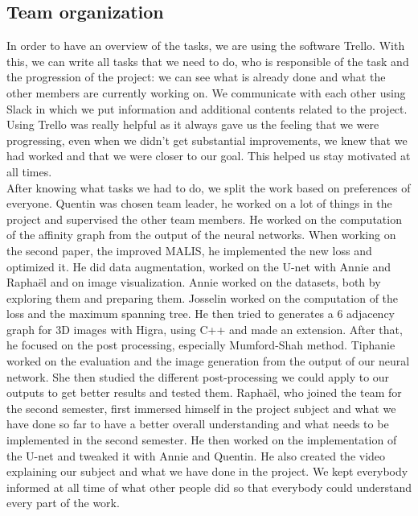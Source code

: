 \subsection{Team organization}

In order to have an overview of the tasks, we are using the software Trello.
With this, we can write all tasks that we need to do, who is responsible of
the task and the progression of the project: we can see what is already done
and what the other members are currently working on. We communicate with each
other using Slack in which we put information and additional contents related
to the project. \\
Using Trello was really helpful as it always gave us the feeling that we were
progressing, even when we didn't get substantial improvements, we knew that we
had worked and that we were closer to our goal. This helped us stay motivated
at all times.\\

After knowing what tasks we had to do, we split the work based on preferences of
everyone. 
Quentin was chosen team leader, he worked on a lot of things in the project and 
supervised the other team members. He worked on the computation of the affinity 
graph from the output of the neural networks. When working on the second paper,
the improved MALIS, he implemented the new loss and optimized it. He did data
augmentation, worked on the U-net with Annie and Raphaël and on image
visualization.
Annie worked on the datasets, both by exploring them and preparing them. 
Josselin worked on the computation of the loss and the maximum spanning tree. 
He then tried to generates a 6 adjacency graph for 3D images with Higra, using 
C++ and made an extension. After that, he focused on the post processing,
especially Mumford-Shah method.
Tiphanie worked on the evaluation and the image generation from the output of
our neural network. She then studied the different post-processing we could apply
to our outputs to get better results and tested them.
Raphaël, who joined the team for the second semester, first immersed himself in the
project subject and what we have done so far to have a better overall understanding
and what needs to be implemented in the second semester. He then worked on the 
implementation of the U-net and tweaked it with Annie and Quentin. He also created
the video explaining our subject and what we have done in the project.
We kept everybody informed at all time of what other people did so that
everybody could understand every part of the work.\\


